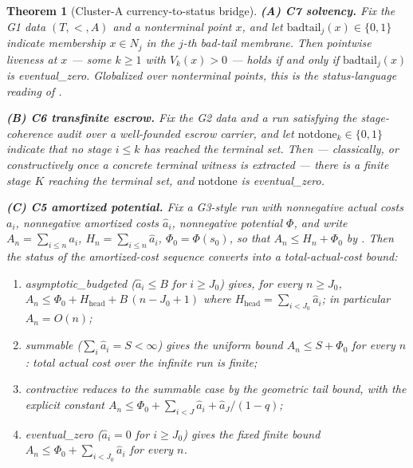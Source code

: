 \documentclass[11pt]{article}
\newtheorem{theorem}{Theorem}[section]
\theoremstyle{definition}
\begin{document}
\begin{theorem}[Cluster-A currency-to-status bridge]\label{thm:currency-bridge}
\textbf{(A) C7 solvency.} Fix the G1 data $(T, <, A)$ and a nonterminal point $x$, and let
$\mathrm{badtail}_j(x) \in \{0, 1\}$ indicate membership $x \in N_j$ in the $j$-th bad-tail
membrane. Then pointwise liveness at $x$ --- some $k \ge 1$ with $V_k(x) > 0$ --- holds if and only
if $\mathrm{badtail}_j(x)$ is \textit{eventual\_zero}. Globalized over nonterminal points, this is
the status-language reading of .

\textbf{(B) C6 transfinite escrow.} Fix the G2 data and a run satisfying the stage-coherence audit
over a well-founded escrow carrier, and let $\mathrm{notdone}_k \in \{0, 1\}$ indicate that no stage
$i \le k$ has reached the terminal set. Then --- classically, or constructively once a concrete
terminal witness is extracted --- there is a finite stage $K$ reaching the terminal set, and
$\mathrm{notdone}$ is \textit{eventual\_zero}.

\textbf{(C) C5 amortized potential.} Fix a G3-style run with nonnegative actual costs $a_i$,
nonnegative amortized costs $\widehat{a}_i$, nonnegative potential $\Phi$, and write
$A_n = \sum_{i \le n} a_i$, $H_n = \sum_{i \le n} \widehat{a}_i$, $\Phi_0 = \Phi(s_0)$, so that
$A_n \le H_n + \Phi_0$ by . Then the status of the amortized-cost sequence converts
into a total-actual-cost bound:
\begin{enumerate}
  \item \textit{asymptotic\_budgeted} ($\widehat{a}_i \le B$ for $i \ge J_0$) gives, for every
    $n \ge J_0$, $A_n \le \Phi_0 + H_{\mathrm{head}} + B\,(n - J_0 + 1)$ where
    $H_{\mathrm{head}} = \sum_{i < J_0} \widehat{a}_i$; in particular $A_n = O(n)$;
  \item \textit{summable} ($\sum_i \widehat{a}_i = S < \infty$) gives the uniform bound
    $A_n \le S + \Phi_0$ for every $n$: total actual cost over the infinite run is finite;
  \item \textit{contractive} reduces to the summable case by the geometric tail bound, with the
    explicit constant $A_n \le \Phi_0 + \sum_{i < J} \widehat{a}_i + \widehat{a}_J / (1 - q)$;
  \item \textit{eventual\_zero} ($\widehat{a}_i = 0$ for $i \ge J_0$) gives the fixed finite bound
    $A_n \le \Phi_0 + \sum_{i < J_0} \widehat{a}_i$ for every $n$.
\end{enumerate}
\end{theorem}
\end{document}
